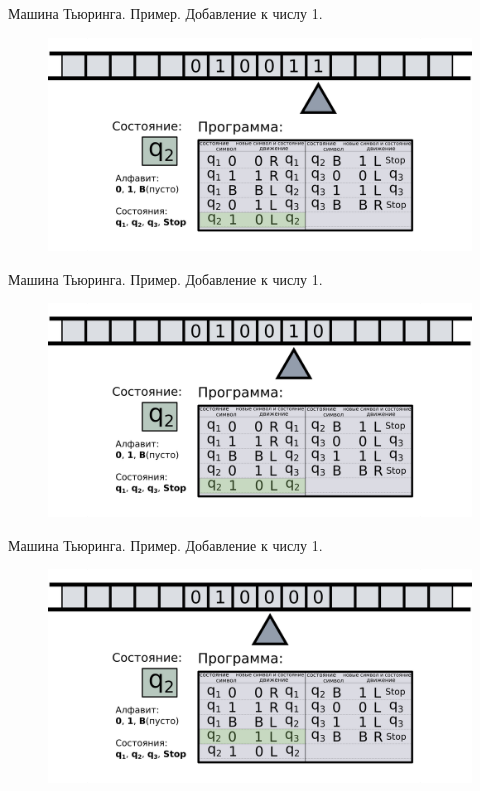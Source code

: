 \documentclass[newPxFont]{beamer}
\begin{document}
\begin{frame}{Машина Тьюринга. Пример. Добавление к числу 1.}
	\begin{figure}
		\centerline{\includegraphics[width=1.5\linewidth]{images/tm_ex_9.png}}
	\end{figure}
\end{frame}

\begin{frame}{Машина Тьюринга. Пример. Добавление к числу 1.}
	\begin{figure}
		\centerline{\includegraphics[width=1.5\linewidth]{images/tm_ex_10.png}}
	\end{figure}
\end{frame}


\begin{frame}{Машина Тьюринга. Пример. Добавление к числу 1.}
	\begin{figure}
		\centerline{\includegraphics[width=1.5\linewidth]{images/tm_ex_11.png}}
	\end{figure}
\end{frame}
\end{document}
